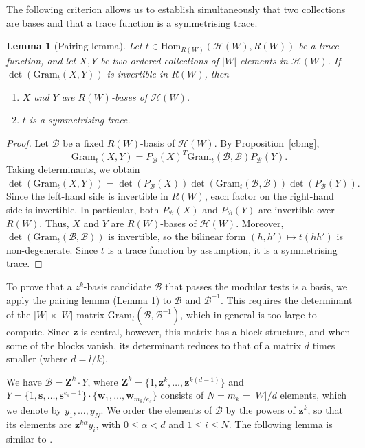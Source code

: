 \documentclass[11pt, reqno]{amsart}
\newcommand{\gram}{\mathrm{Gram}}
\newcommand{\cB}{\mathcal{B}}
\newcommand{\cH}{\mathcal{H}}
\newcommand{\Hom}{\mathrm{Hom}}
\numberwithin{equation}{section}
\newtheorem{lemma}[theorem]{Lemma}
\theoremstyle{remark}
\begin{document}
The following criterion allows us to establish simultaneously that two collections are bases and that a trace function is a symmetrising trace.

\begin{lemma}[Pairing lemma]\label{pair}
	Let $t\in\Hom_{R(W)}(\cH(W),R(W))$ be a trace function, and let $X,Y$ be two ordered collections of $|W|$ elements in $\cH(W)$.
	If $\det(\gram_t(X,Y))$ is invertible in $R(W)$, then
	\begin{enumerate}
		\item $X$ and $Y$ are $R(W)$-bases of $\cH(W)$.\smallbreak
		\item $t$ is a symmetrising trace.
	\end{enumerate}
\end{lemma}


\begin{proof}
	Let $\cB$ be a fixed $R(W)$-basis of $\cH(W)$. By Proposition~\ref{cbmg},
	$$
	\gram_t(X,Y)
	=
	P_{\cB}(X)^T
	\gram_t(\cB,\cB)
	P_{\cB}(Y).
	$$
	Taking determinants, we obtain
	$
	\det(\gram_t(X,Y))
	=
	\det(P_{\cB}(X))
	\det(\gram_t(\cB,\cB))
	\det(P_{\cB}(Y)).
	$
	Since the left-hand side is invertible in $R(W)$, each factor on the right-hand side is invertible. In particular, both $P_{\cB}(X)$ and $P_{\cB}(Y)$ are invertible over $R(W)$. Thus, $X$ and $Y$ are $R(W)$-bases of $\cH(W)$.
	Moreover, $\det(\gram_t(\cB,\cB))$ is invertible, so the bilinear form
	$(h,h')\longmapsto t(hh')$ is non-degenerate. Since $t$ is a trace function by assumption, it is a symmetrising trace.
\end{proof}



To prove that a $z^k$-basis candidate $\cB$ that passes the modular
tests is a basis, we apply the pairing lemma (Lemma \ref{pair}) to $\cB$ and
$\cB^{-1}$. This requires the determinant of the $|W|\times|W|$ matrix
$\mathrm{Gram}_t(\cB,\cB^{-1})$, which in general is too large to compute.
Since $\mathbf z$ is central, however, this matrix has a block
structure, and when some of the blocks vanish, its determinant reduces
to that of a matrix $d$ times smaller (where $d=l/k$). 


We have $\cB=\mathbf Z^k\cdot Y$,
where $\mathbf Z^k=\{1,\mathbf z^k,\dots,\mathbf z^{k(d-1)}\}$ and
$Y=\{1,\mathbf s,\dots,\mathbf s^{e_s-1}\}\cdot\{\mathbf w_1,\dots,
\mathbf w_{m_k/e_s}\}$ consists of $N=m_k=|W|/d$ elements, which we
denote by $y_1,\dots,y_N$. We order the elements of $\cB$ by the powers
of $\mathbf z^k$, so that its elements are $\mathbf z^{k\alpha}y_i$,
with $0\le\alpha<d$ and $1\le i\le N$. The following lemma is
similar to \cite[\S 3.3.1]{ChPf}.
\end{document}
